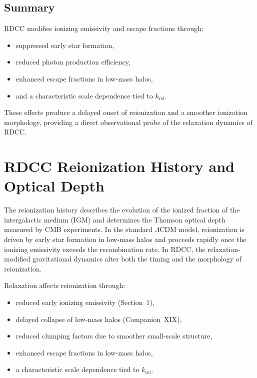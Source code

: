 \documentclass[11pt,a4paper]{article}
\begin{document}
\subsection{Summary}

RDCC modifies ionizing emissivity and escape fractions through:
\begin{itemize}
\item suppressed early star formation,
\item reduced photon production efficiency,
\item enhanced escape fractions in low-mass halos,
\item and a characteristic scale dependence tied to $k_{\mathrm{rel}}$.
\end{itemize}

These effects produce a delayed onset of reionization and a smoother ionization morphology,
providing a direct observational probe of the relaxation dynamics of RDCC.

\section{RDCC Reionization History and Optical Depth}

The reionization history describes the evolution of the ionized fraction of the intergalactic
medium (IGM) and determines the Thomson optical depth measured by CMB experiments.
In the standard $\Lambda$CDM model, reionization is driven by early star formation in
low-mass halos and proceeds rapidly once the ionizing emissivity exceeds the recombination
rate. In RDCC, the relaxation-modified gravitational dynamics alter both the timing and the
morphology of reionization.

Relaxation affects reionization through:
\begin{itemize}
\item reduced early ionizing emissivity (Section~1),
\item delayed collapse of low-mass halos (Companion~XIX),
\item reduced clumping factors due to smoother small-scale structure,
\item enhanced escape fractions in low-mass halos,
\item a characteristic scale dependence tied to $k_{\mathrm{rel}}$.
\end{itemize}
\end{document}
